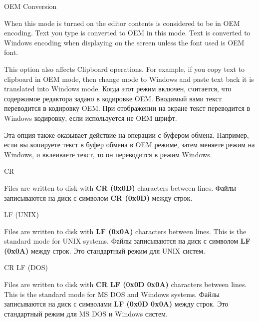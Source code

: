 \begin{popup}
\caption{OEM Conversion}
\ifenglish
When this mode is turned on the editor contents is considered to be in OEM encoding.
Text you type is converted to OEM in this mode. Text is converted to Windows
encoding when displaying on the screen unless the font used is OEM font.

This option also affects Clipboard operations. For example, if you copy text
to clipboard in OEM mode, then change mode to Windows and paste text back it is
translated into Windows mode.
\else
Когда этот режим включен, считается, что содержимое редактора задано в кодировке
OEM. Вводимый вами текст переводится в кодировку OEM. При отображении на экране
текст переводится в Windows кодировку, если используется не OEM шрифт.

Эта опция также оказывает действие на операции с буфером обмена. Например, если
вы копируете текст в буфер обмена в OEM режиме, затем меняете режим на Windows,
и вклеиваете текст, то он переводится в режим Windows.
\fi
\end{popup}

\begin{popup}
\caption{CR}
\ifenglish
Files are written to disk with {\bf CR (0x0D)} characters between lines.
\else
Файлы записываются на диск с символом {\bf CR (0x0D)} между строк.
\fi
\end{popup}

\begin{popup}
\caption{LF (UNIX)}
\ifenglish
Files are written to disk with {\bf LF (0x0A)} characters between lines.
This is the standard mode for UNIX systems.
\else
Файлы записываются на диск с символом {\bf LF (0x0A)} между строк.
Это стандартный режим для UNIX систем.
\fi
\end{popup}

\begin{popup}
\caption{CR LF (DOS)}
\ifenglish
Files are written to disk with {\bf CR LF (0x0D 0x0A)} characters between lines.
This is the standard mode for MS DOS and Windows systems.
\else
Файлы записываются на диск с символами {\bf LF (0x0D 0x0A)} между строк.
Это стандартный режим для MS DOS и Windows систем.
\fi
\end{popup}

